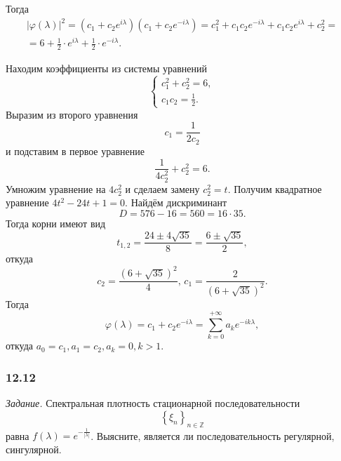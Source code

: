 Тогда
\begin{gather*}
  \left| \varphi \left( \lambda \right) \right|^2 =
  \left( c_1 + c_2 e^{i \lambda} \right) \left( c_1 + c_2 e^{-i \lambda } \right) =
  c_1^2 + c_1 c_2 e^{-i \lambda } + c_1 c_2 e^{i \lambda } + c_2^2 = \\
  = 6 + \frac{1}{2} \cdot e^{i \lambda } + \frac{1}{2} \cdot e^{-i \lambda }.
\end{gather*}

Находим коэффициенты из системы уравнений
\begin{equation*}
  \begin{cases}
    c_1^2 + c_2^2 = 6, \\
    c_1 c_2 = \frac{1}{2}.
  \end{cases}
\end{equation*}
Выразим из второго уравнения
\begin{equation*}
  c_1 =
  \frac{1}{2c_2}
\end{equation*}
и подставим в первое уравнение
\begin{equation*}
  \frac{1}{4c_2^2} + c_2^2 = 6.
\end{equation*}
Умножим уравнение на $4c_2^2$ и сделаем замену $c_2^2 = t$.
Получим квадратное уравнение $4t^2 - 24t + 1 = 0$.
Найдём дискриминант
\begin{equation*}
  D =
  576 - 16 = 560 = 16 \cdot 35.
\end{equation*}
Тогда корни имеют вид
\begin{equation*}
  t_{1, 2} =
  \frac{24 \pm 4 \sqrt{35}}{8} =
  \frac{6 \pm \sqrt{35}}{2},
\end{equation*}
откуда
\begin{equation*}
  c_2 = \frac{ \left( 6 + \sqrt{35} \right)^2}{4}, \,
  c_1 = \frac{2}{ \left( 6 + \sqrt{35} \right)^2}.
\end{equation*}
Тогда
\begin{equation*}
  \varphi \left( \lambda \right) =
  c_1 + c_2 e^{-i \lambda } =
  \sum \limits_{k = 0}^{+\infty } a_k e^{-ik \lambda },
\end{equation*}
откуда $a_0 = c_1, a_1 = c_2, a_k = 0, k > 1$.

\subsubsection*{12.12}

\textit{Задание.}
Спектральная плотность стационарной последовательности
\begin{equation*}
  \left\{ \xi_n \right\}_{n \in \mathbb{Z}}
\end{equation*}
равна $f \left( \lambda \right) = e^{-\frac{1}{ \left| \lambda \right| }}$.
Выясните, является ли последовательность регулярной, сингулярной.

